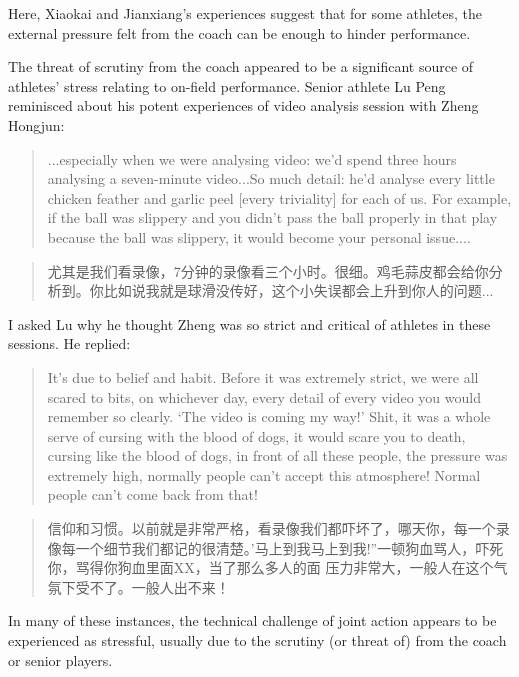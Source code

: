 \begin{CJK}{UTF8}{gbsn}
Here, Xiaokai and Jianxiang's experiences suggest that for some athletes, the external pressure felt from the coach can be enough to hinder performance.

The threat of scrutiny from the coach appeared to be a significant source of athletes' stress relating to on-field performance.  Senior athlete Lu Peng reminisced about his potent experiences of video analysis session with Zheng Hongjun:

\begin{quote}
  ...especially when we were analysing video: we'd spend three hours analysing a seven-minute video...So much detail: he'd analyse every little chicken feather and garlic peel [every triviality] for each of us. For example, if the ball was slippery and you didn't pass the ball properly in that play because the ball was slippery, it would become your personal issue....
\end{quote}

\begin{quote}
    尤其是我们看录像，7分钟的录像看三个小时。很细。鸡毛蒜皮都会给你分析到。你比如说我就是球滑没传好，这个小失误都会上升到你人的问题...
\end{quote}

I asked Lu why he thought Zheng was so strict and critical of athletes in these sessions.  He replied:

\begin{quote}
    It's due to belief and habit. Before it was extremely strict, we were all scared to bits, on whichever day, every detail of every video you would remember so clearly. `The video is coming my way!'  Shit, it was a whole serve of cursing with the blood of dogs, it would scare you to death, cursing like the blood of dogs, in front of all these people, the pressure was extremely high, normally people can't accept this atmosphere! Normal people can't come back from that!
\end{quote}

  \begin{quote}
      信仰和习惯。以前就是非常严格，看录像我们都吓坏了，哪天你，每一个录像每一个细节我们都记的很清楚。'马上到我马上到我!''一顿狗血骂人，吓死你，骂得你狗血里面XX，当了那么多人的面 压力非常大，一般人在这个气氛下受不了。一般人出不来！
  \end{quote}


In many of these instances, the technical challenge of joint action appears to be experienced as stressful, usually due to the scrutiny (or threat of) from the coach or senior players.



\end{CJK}

